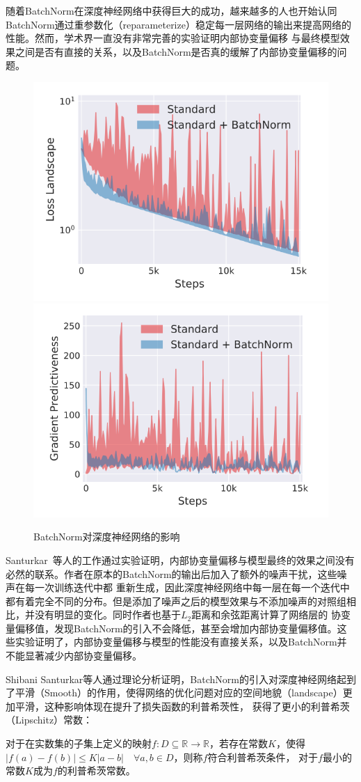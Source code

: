 随着BatchNorm在深度神经网络中获得巨大的成功，越来越多的人也开始认同BatchNorm通过重参数化（reparameterize）稳定每一层网络的输出来提高网络的性能。然而，学术界一直没有非常完善的实验证明内部协变量偏移
与最终模型效果之间是否有直接的关系，以及BatchNorm是否真的缓解了内部协变量偏移的问题。

\begin{figure}
  \centering
    {\includegraphics[width=0.46\linewidth]{figures/landscape.png}}
    {\includegraphics[width=0.47\linewidth]{figures/gradient.png}}
  \caption{BatchNorm对深度神经网络的影响~\citep{santurkar2018does}}
  \label{fig:landsacpe}
\end{figure}

Santurkar~\citep{santurkar2018does}等人的工作通过实验证明，内部协变量偏移与模型最终的效果之间没有必然的联系。作者在原本的BatchNorm的输出后加入了额外的噪声干扰，这些噪声在每一次训练迭代中都
重新生成，因此深度神经网络中每一层在每一个迭代中都有着完全不同的分布。但是添加了噪声之后的模型效果与不添加噪声的对照组相比，并没有明显的变化。同时作者也基于$L_2$距离和余弦距离计算了网络层的
协变量偏移值，发现BatchNorm的引入不会降低，甚至会增加内部协变量偏移值。这些实验证明了，内部协变量偏移与模型的性能没有直接关系，以及BatchNorm并不能显著减少内部协变量偏移。

Shibani Santurkar等人通过理论分析证明，BatchNorm的引入对深度神经网络起到了平滑（Smooth）的作用，使得网络的优化问题对应的空间地貌（landscape）更加平滑，这种影响体现在提升了损失函数的利普希茨性，
获得了更小的利普希茨（Lipschitz）常数：

\begin{definition}[利普希茨常数]
  对于在实数集的子集上定义的映射$f:D \subseteq \mathbb{R} \rightarrow \mathbb{R}$，若存在常数$K$，使得$|f(a)-f(b)| \leq K|a-b| \quad \forall a,b \in D$，则称$f$符合利普希茨条件，
  对于$f$最小的常数$K$成为$f$的利普希茨常数。
\end{definition}

